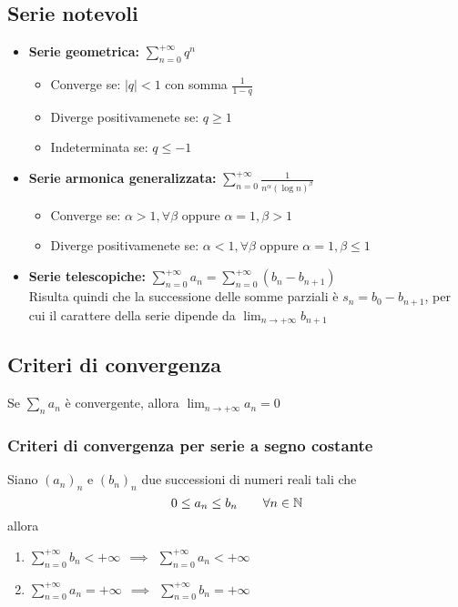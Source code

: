 \documentclass{article}
\begin{document}
\subsection*{Serie notevoli}
\begin{itemize}
    \item \textbf{Serie geometrica:} $\sum_{n=0}^{+\infty}q^n$
    \begin{itemize}
        \item Converge se: $|q|<1$ con somma $\frac{1}{1-q}$
        \item Diverge positivamenete se: $q\geq 1$
        \item Indeterminata se:  $q\leq -1$
    \end{itemize}
    \item \textbf{Serie armonica generalizzata:} $\sum_{n=0}^{+\infty}\frac{1}{n^\alpha(\log n)^\beta}$
    \begin{itemize}
        \item Converge se: $\alpha>1, \forall \beta$ oppure $\alpha =1, \beta >1$
        \item Diverge positivamenete se: $\alpha< 1, \forall \beta$ oppure $\alpha =1, \beta \leq 1$
    \end{itemize}
    \item \textbf{Serie telescopiche:} $\sum_{n=0}^{+\infty}a_n=\sum_{n=0}^{+\infty}(b_n-b_{n+1})$\\
    Risulta quindi che la successione delle somme parziali è $s_n=b_0-b_{n+1}$, per cui il carattere della serie dipende da $\lim_{n\to+\infty}b_{n+1}$
\end{itemize}

\subsection*{Criteri di convergenza}
\begin{shadedTheorem}
        Se $\sum_na_n$ è convergente, allora $\lim_{n\to+\infty}a_n=0$
\end{shadedTheorem}
\subsubsection*{Criteri di convergenza per serie a segno costante}
\begin{shadedTheorem}[Confronto]
    Siano $(a_n)_n$ e $(b_n)_n$ due successioni di numeri reali tali che 
    \[0\leq a_n\leq b_n~~~~~~\forall n\in \mathbb{N}\]
    allora
    \begin{enumerate}[label=\roman*\:\textnormal{)},itemindent=*]
        \item $\sum_{n=0}^{+\infty}b_n<+\infty~~\implies~~\sum_{n=0}^{+\infty}a_n<+\infty$
        \item $\sum_{n=0}^{+\infty}a_n=+\infty~~\implies~~\sum_{n=0}^{+\infty}b_n=+\infty$
    \end{enumerate}
\end{shadedTheorem}
\end{document}
